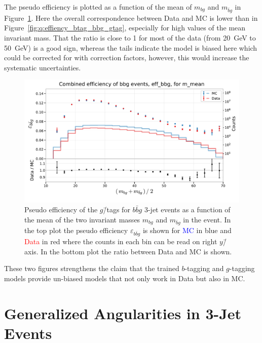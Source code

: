 The pseudo efficiency is plotted as a function of the  mean of $m_{bg}$ and $m_{\bar{b}g}$ in Figure~\ref{fig:q:effiency_btag_bbg_m_mean}. Here the overall correspondence between Data and MC is lower than in Figure~\ref{fig:q:effiency_btag_bbg_gtag}, especially for high values of the mean invariant mass. That the ratio is close to \num{1} for most of the data (from \SI{20}{\GeV} to \SI{50}{\GeV}) is a good sign, whereas the tails indicate the model is biased here which could be corrected for with correction factors, however, this would increase the systematic uncertainties. 

\begin{figure}[h!]
  \centerfloat
  \includegraphics[width=1.1\textwidth, trim=10 20 5 40, clip]{figures/quarks/eff_bbg_m_mean-down_sample=1.00-ML_vars=vertex-selection=b-ejet_min=4-n_iter_RS_lgb=99-n_iter_RS_xgb=9-cdot_cut=0.90-version=19.pdf}
  \caption[$g$\=/Tagging Pseudo Efficiency for $b\bar{b}g$\=/Events as a Function of The Mean Invariant Mass]
          {Pseudo efficiency of the $g$\=/tags for $b\bar{b}g$ 3-jet events as a function of the mean of the two invariant masses $m_{bg}$ and $m_{\bar{b}g}$ in the event. In the top plot the pseudo efficiency $\varepsilon_{b\bar{b}g}$ is shown for \textcolor{blue}{MC} in blue and \textcolor{red}{Data} in red where the counts in each bin can be read on right $y$\=/axis. In the bottom plot the ratio between Data and MC is shown.} 
  \label{fig:q:effiency_btag_bbg_m_mean}
\end{figure}

These two figures strengthens the claim that the trained $b$-tagging and $g$-tagging models provide un-biased models that not only work in Data but also in MC. 

\section{Generalized Angularities in 3-Jet Events}
\label{sec:q:generalized_angularities_3j}

